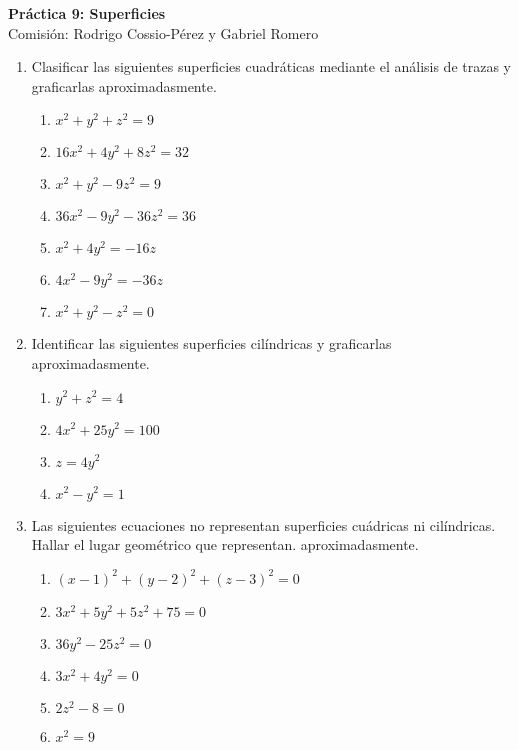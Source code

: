 \documentclass[a4paper]{article}
\newcommand{\exercise}{\item}
\begin{document}
\noindent \hrulefill 
\vspace{-7pt}
\begin{center} 
	\textbf{ Práctica 9: Superficies } \\
	Comisión: Rodrigo Cossio-Pérez y Gabriel Romero
\end{center}
\vspace{-10pt}
\hrulefill
\begin{enumerate}
	\exercise Clasificar las siguientes superficies cuadráticas mediante el análisis de trazas y graficarlas aproximadasmente.
	\begin{multicols}{2}
	\begin{enumerate} [label=(\alph*)]
		\item $x^2+y^2+z^2=9$
		\item $16x^2+4y^2+8z^2=32$
		\item $x^2+y^2-9z^2=9$
		\item $36x^2-9y^2-36z^2=36$
		\item $x^2+4y^2=-16z$
		\item $4x^2-9y^2=-36z$
		\item $x^2+y^2-z^2=0$
	\end{enumerate}
	\end{multicols}
	\exercise Identificar las siguientes superficies cilíndricas y graficarlas aproximadasmente.
	\begin{multicols}{2}
	\begin{enumerate} [label=(\alph*)]
		\item $y^2+z^2=4$
		\item $4x^2+25y^2=100$
		\item $z=4y^2$
		\item $x^2-y^2=1$
	\end{enumerate}
	\end{multicols}
	\exercise Las siguientes ecuaciones no representan superficies cuádricas ni cilíndricas. Hallar el lugar geométrico que representan. aproximadasmente.
	\begin{multicols}{2}
	\begin{enumerate} [label=(\alph*)]
		\item $(x-1)^2+(y-2)^2+(z-3)^2=0$
		\item $3x^2+5y^2+5z^2+75=0$
		\item $36y^2-25z^2=0$
		\item $3x^2+4y^2=0$
		\item $2z^2-8=0$
		\item $x^2=9$
	\end{enumerate}
	\end{multicols}

\end{enumerate}
\end{document}
